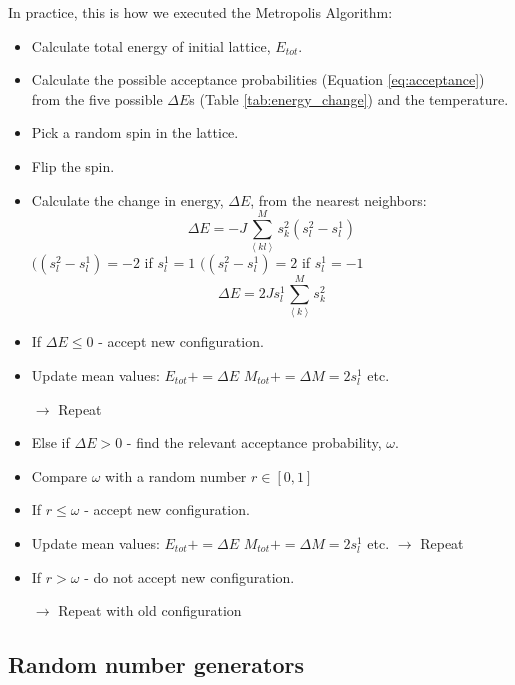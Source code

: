In practice, this is how we executed the Metropolis Algorithm:
\begin{itemize}
\item Calculate total energy of initial lattice, $E_{tot}$.

\item Calculate the possible acceptance probabilities (Equation \ref{eq:acceptance}) from the five possible $\Delta E$s (Table \ref{tab:energy_change}) and the temperature.

\item Pick a random spin in the lattice.

\item Flip the spin.

\item Calculate the change in energy, $\Delta E$, from the nearest neighbors:
    $$ \Delta E = -J\sum_{\left<kl\right>}^M s^2_k \left( s_l^2-s_l^1\right)$$
    \subitem $(\left( s_l^2-s_l^1\right) = -2$  if $s_l^1 = 1$ 
    \subitem $(\left( s_l^2-s_l^1\right) = 2$  if $s_l^1 = -1$
    $$ \Delta E = 2Js_l^1\sum_{\left<k\right>}^M s^2_k$$

\item If $\Delta E \leq 0$ - accept new configuration.

\item Update mean values:
\subitem    $E_{tot} += \Delta E$ 
\subitem    $M_{tot} += \Delta M = 2s_l^1$ etc.

\subitem $\rightarrow$ Repeat

\item Else if $\Delta E > 0$ - find the relevant acceptance probability, $\omega$.

\item Compare $\omega$ with a random number $r \in [0,1]$
\item If $r \leq \omega$ - accept new configuration.

\item Update mean values:
\subitem    $E_{tot} += \Delta E$ 
\subitem    $M_{tot} += \Delta M = 2s_l^1$ etc.
\subitem $\rightarrow$ Repeat

\item If $r > \omega$ - do not accept new configuration.

\subitem $\rightarrow$ Repeat with old configuration 

\end{itemize}

\subsection{Random number generators}

